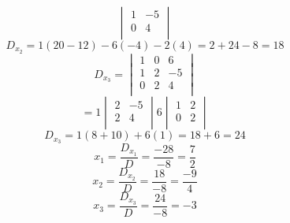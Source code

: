 \documentclass[journal]{IEEEtran}
\begin{document}
{\[\begin{vmatrix}
					1&	-5	\\
					0&	4	\\
				\end{vmatrix}
			\]
			\[D_{x_2}=1(20-12)-6(-4)-2(4)=2+24-8=18\]
			\[
				D_{x_3} = \begin{vmatrix}
					1&	0&	6	\\
					1&	2&	-5	\\
					0&	2&	4	\\
				\end{vmatrix}
			\]
			\[
				= 1\begin{vmatrix}
					2&	-5	\\
					2&	4	\\
				\end{vmatrix}
				6\begin{vmatrix}
					1&	2	\\
					0&	2	\\
				\end{vmatrix}
			\]
			\[D_{x_3} = 1(8+10)+6(1) = 18+6 = 24\]
			\[x_1 = \frac{D_{x_1}}{D}=\frac{-28}{-8}=\frac{7}{2}\]
			\[x_2 = \frac{D_{x_2}}{D}=\frac{18}{-8}=\frac{-9}{4}\]
			\[x_3 = \frac{D_{x_3}}{D}=\frac{24}{-8}=-3\]
	}
\end{document}

